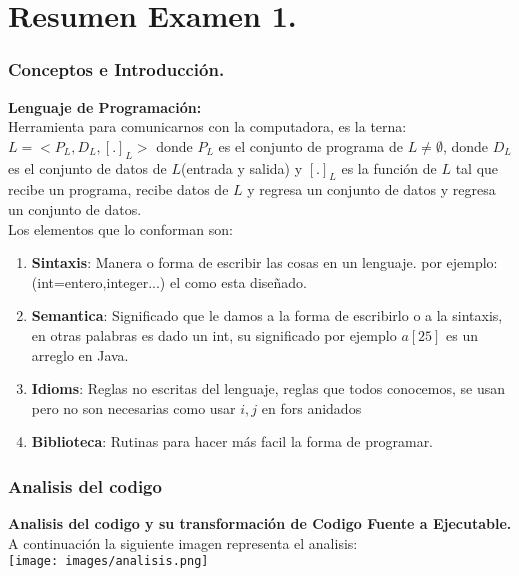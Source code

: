 \documentclass[12pt]{article}
\begin{document}

{\color{blue} \section*{Resumen Examen 1.}}

{\color{blue} \subsubsection*{Conceptos e Introducción.}}
\vspace{-0.5em}

\textbf{Lenguaje de Programación:} \\
Herramienta para comunicarnos con la computadora, es la terna: $L=<P_L , D_L , [.]_L>$
donde $P_L$ es el conjunto de programa de $L \neq \emptyset$, donde $D_L$ es el conjunto
de datos de $L$(entrada y salida) y $[.]_L$ es la función de $L$ tal que recibe un programa, recibe
datos de $L$ y regresa un conjunto de datos y regresa un conjunto de datos.\\
Los elementos que lo conforman son:\\
\begin{enumerate}
    \item \textbf{Sintaxis}: Manera o forma de escribir las cosas en un lenguaje. por ejemplo: (int=entero,integer...) el como esta diseñado.
    \item \textbf{Semantica}: Significado que le damos a la forma de escribirlo o a la sintaxis, en otras palabras es dado un int, su significado
    por ejemplo $a[25]$ es un arreglo en Java.
    \item \textbf{Idioms}: Reglas no escritas del lenguaje, reglas que todos conocemos, se usan pero no son necesarias como usar $i, j$ en fors anidados
    \item \textbf{Biblioteca}: Rutinas para hacer más facil la forma de programar. 
\end{enumerate}

{\color{blue} \subsubsection*{Analisis del codigo}}
\vspace{-0.5em}

\textbf{Analisis del codigo y su transformación de Codigo Fuente a Ejecutable.} \\
A continuación la siguiente  imagen representa el analisis:\\

\texttt{[image: images/analisis.png]} \\
\end{document}
